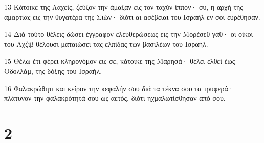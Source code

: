 \par 13 Κάτοικε της Λαχείς, ζεύξον την άμαξαν εις τον ταχύν ίππον· συ, η αρχή της αμαρτίας εις την θυγατέρα της Σιών· διότι αι ασέβειαι του Ισραήλ εν σοι ευρέθησαν.
\par 14 Διά τούτο θέλεις δώσει έγγραφον ελευθερώσεως εις την Μορέσεθ-γάθ· οι οίκοι του Αχζίβ θέλουσι ματαιώσει τας ελπίδας των βασιλέων του Ισραήλ.
\par 15 Θέλω έτι φέρει κληρονόμον εις σε, κάτοικε της Μαρησά· θέλει ελθεί έως Οδολλάμ, της δόξης του Ισραήλ.
\par 16 Φαλακρώθητι και κείρον την κεφαλήν σου διά τα τέκνα σου τα τρυφερά· πλάτυνον την φαλακρότητά σου ως αετός, διότι ηχμαλωτίσθησαν από σου.

\chapter{2}

